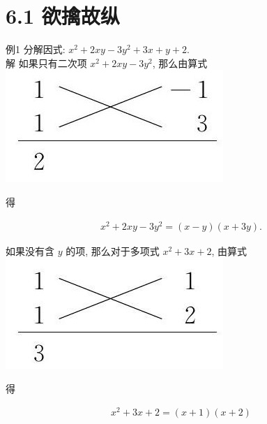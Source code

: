 \documentclass[10pt]{article}
\begin{document}
\section*{6.1 欲擒故纵}
例1 分解因式: $x^{2}+2 x y-3 y^{2}+3 x+y+2$.\\
解 如果只有二次项 $x^{2}+2 x y-3 y^{2}$, 那么由算式\\
\includegraphics[max width=\textwidth, center]{2024_10_30_bd799899fef40368a068g-041(1)}

得

\begin{align*}
x^{2}+2 x y-3 y^{2}=(x-y)(x+3 y) .
\end{align*}

如果没有含 $y$ 的项, 那么对于多项式 $x^{2}+3 x+2$, 由算式\\
\includegraphics[max width=\textwidth, center]{2024_10_30_bd799899fef40368a068g-041(2)}

得

\begin{align*}
x^{2}+3 x+2=(x+1)(x+2)
\end{align*}
\end{document}
